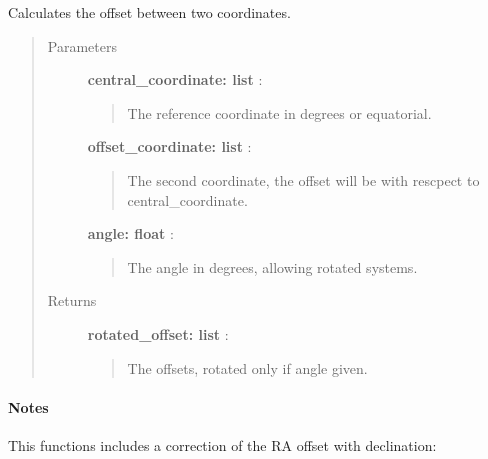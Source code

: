 \documentclass[a4paper,10pt,english]{sphinxmanual}
\begin{document}
\begin{fulllineitems}
\label{functions:astrolyze.functions.astro_functions.calc_offset}
Calculates the offset between two coordinates.
\begin{quote}\begin{description}
\item[{Parameters }] \leavevmode
\textbf{central\_coordinate: list} :
\begin{quote}

The reference coordinate in degrees or equatorial.
\end{quote}

\textbf{offset\_coordinate: list} :
\begin{quote}

The second coordinate, the offset will be with rescpect to
central\_coordinate.
\end{quote}

\textbf{angle: float} :
\begin{quote}

The angle in degrees, allowing rotated systems.
\end{quote}

\item[{Returns }] \leavevmode
\textbf{rotated\_offset: list} :
\begin{quote}

The offsets, rotated only if angle given.
\end{quote}

\end{description}\end{quote}
\paragraph{Notes}

This functions includes a correction of the RA offset with declination:

\end{fulllineitems}

\end{document}
